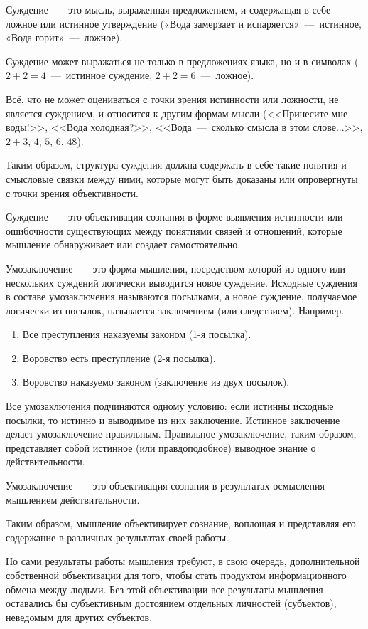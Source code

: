 \documentclass[14pt]{extarticle}
\begin{document}
Суждение~---~это мысль, выраженная предложением, и содержащая в себе ложное или истинное утверждение («Вода замерзает и испаряется»~---~истинное, «Вода горит»~---~ложное).

Суждение может выражаться не только в предложениях языка, но и в символах ($2 + 2 = 4$~---~истинное суждение, $2 + 2 = 6$~---~ложное).

Всё, что не может оцениваться с точки зрения истинности или ложности, не является суждением, и относится к другим формам мысли (<<Принесите мне воды!>>, <<Вода холодная?>>, <<Вода~---~сколько смысла в этом слове...>>, $2 + 3$, $4$, $5$, $6$, $48$).

Таким образом, структура суждения должна содержать в себе такие понятия и смысловые связки между ними, которые могут быть доказаны или опровергнуты с точки зрения объективности. 

Суждение~---~это объективация сознания в форме выявления истинности или ошибочности существующих между понятиями связей и отношений, которые мышление обнаруживает или создает самостоятельно.

Умозаключение~---~это форма мышления, посредством которой из одного или нескольких суждений логически выводится новое суждение. Исходные суждения в составе умозаключения называются посылками, а новое суждение, получаемое логически из посылок, называется заключением (или следствием). Например.

\begin{enumerate}
	\item Все преступления наказуемы законом (1-я посылка).
	\item Воровство есть преступление (2-я посылка).
	\item Воровство наказуемо законом (заключение из двух посылок).
\end{enumerate}

Все умозаключения подчиняются одному условию: если истинны исходные посылки, то истинно и выводимое из них заключение. Истинное заключение делает умозаключение правильным. Правильное умозаключение, таким образом, представляет собой истинное (или правдоподобное) выводное знание о действительности. 

Умозаключение~---~это объективация сознания в результатах осмысления мышлением действительности.

Таким образом, мышление объективирует сознание, воплощая и представляя его содержание в различных результатах своей работы.

Но сами результаты работы мышления требуют, в свою очередь, дополнительной собственной объективации для того, чтобы стать продуктом информационного обмена между людьми. Без этой объективации все результаты мышления оставались бы субъективным достоянием отдельных личностей (субъектов), неведомым для других субъектов.
\end{document}
